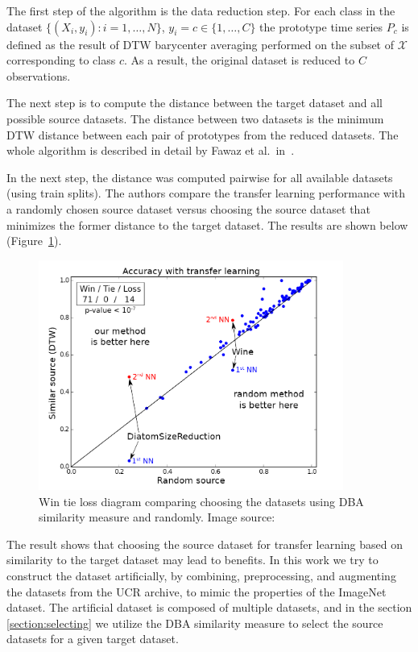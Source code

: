 \documentclass[a4paper,11pt,twoside]{report}
\theoremstyle{definition}
\begin{document}
The first step of the algorithm is the data reduction step. For each class in the dataset $\{(X_i, y_i): i=1, \dots , N\}$, $y_i=c \in \{ 1, \dots, C\}$ the prototype time series $P_c$ is defined as the result of DTW barycenter averaging performed on the subset of $\mathcal{X}$ corresponding to class $c$. As a result, the original dataset is reduced to $C$ observations.


The next step is to compute the distance between the target dataset and all possible source datasets. The distance between two datasets is the minimum DTW distance between each pair of prototypes from the reduced datasets. The whole algorithm is described in detail by Fawaz et al.~in~\cite{transfer_learning_time_series}.

In the next step, the distance was computed pairwise for all available datasets (using train splits). The authors compare the transfer learning performance with a randomly chosen source dataset versus choosing the source dataset that minimizes the former distance to the target dataset. The results are shown below (Figure~\ref{fig:smart_transfer_learning}).
\FloatBarrier


\begin{figure}[h!]
\centering
\includegraphics[width=10cm]{imgs/smart_transfer_learning.png}
\caption{Win tie loss diagram comparing choosing the datasets using DBA similarity measure and randomly. Image source:~\cite{transfer_learning_time_series}}
\label{fig:smart_transfer_learning}
\end{figure}
\FloatBarrier

The result shows that choosing the source dataset for transfer learning based on similarity to the target dataset may lead to benefits. In this work we try to construct the dataset artificially, by combining, preprocessing, and augmenting the datasets from the UCR archive, to mimic the properties of the ImageNet dataset. The artificial dataset is composed of multiple datasets, and in the section \ref{section:selecting} we utilize the DBA similarity measure to select the source datasets for a given target dataset.
\end{document}
